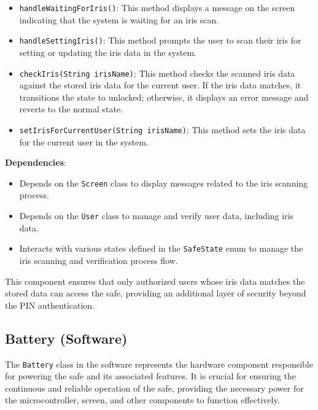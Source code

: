 \documentclass{article}
\begin{document}
\begin{itemize}
    \item \texttt{handleWaitingForIris()}: This method displays a message on the screen indicating that the system is waiting for an iris scan.
    \item \texttt{handleSettingIris()}: This method prompts the user to scan their iris for setting or updating the iris data in the system.
    \item \texttt{checkIris(String irisName)}: This method checks the scanned iris data against the stored iris data for the current user. If the iris data matches, it transitions the state to unlocked; otherwise, it displays an error message and reverts to the normal state.
    \item \texttt{setIrisForCurrentUser(String irisName)}: This method sets the iris data for the current user in the system.
\end{itemize}
\textbf{Dependencies}:
\begin{itemize}
    \item Depends on the \texttt{Screen} class to display messages related to the iris scanning process.
    \item Depends on the \texttt{User} class to manage and verify user data, including iris data.
    \item Interacts with various states defined in the \texttt{SafeState} enum to manage the iris scanning and verification process flow.
\end{itemize}
This component ensures that only authorized users whose iris data matches the stored data can access the safe, providing an additional layer of security beyond the PIN authentication.

\subsection{Battery (Software)}

The \texttt{Battery} class in the software represents the hardware component responsible for powering the safe and its associated features. It is crucial for ensuring the continuous and reliable operation of the safe, providing the necessary power for the microcontroller, screen, and other components to function effectively.
\end{document}
